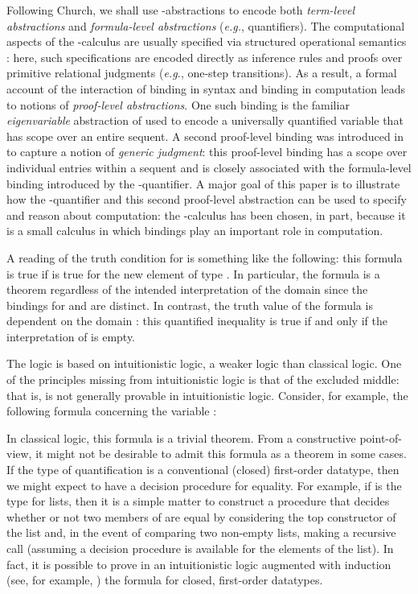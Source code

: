 \documentclass{acmtrans2m}
\begin{document}
Following Church, we shall use -abstractions to encode
both {\em term-level abstractions} and {\em formula-level
abstractions} ({\em e.g.}, quantifiers).  The computational aspects of the
-calculus are usually specified via structured operational
semantics \cite{plotkin81}: here, such specifications are encoded
directly as inference rules and proofs over primitive relational
judgments ({\em e.g.}, one-step transitions).  As a result, a formal account
of the interaction of binding in syntax and binding in computation
leads to notions of {\em proof-level abstractions}.  One such binding
is the familiar {\em eigenvariable} abstraction of
\cite{gentzen35} used to encode a universally quantified variable that has
scope over an entire sequent.  A second proof-level binding was
introduced in \cite{miller05tocl} to capture a notion of {\em generic
judgment}: this proof-level binding has a scope over individual
entries within a sequent and is closely associated with the
formula-level binding introduced by the -quantifier.  A major
goal of this paper is to illustrate how the -quantifier
and this second proof-level abstraction can be used to specify and
reason about computation: the -calculus has been chosen, in part,
because it is a small calculus in which bindings play an important role
in computation.

A reading of the truth condition for  is something
like the following: this formula is true if  is true for the new
element  of type .  In particular, the formula  is a theorem regardless of the
intended interpretation of the domain  since the bindings for
 and  are distinct.  In contrast, the truth value of the
formula  is dependent on the
domain : this quantified inequality is true if and only if 
the interpretation of  is empty.


The  logic is based on
intuitionistic logic, a weaker logic than classical logic.  One of the
principles missing from intuitionistic logic is that of the excluded
middle: that is,  is not generally provable in
intuitionistic logic.  Consider, for example, the following formula
concerning the variable :

In classical logic, this formula is a trivial theorem.  From a
constructive point-of-view, it might not be desirable to admit this
formula as a theorem in some cases. 
If the type of quantification  is
a conventional (closed) first-order datatype, then we might expect to have a
decision procedure for equality.  For example, if  is the type
for lists, then it is a simple matter to construct a procedure that
decides whether or not two members of  are equal by
considering the top constructor of the list and, in the event of
comparing two non-empty lists, making a recursive call (assuming a
decision procedure is available for the elements of the list).  In fact, it
is possible to prove in an intuitionistic logic augmented with
induction (see, for example, \cite{tiu04phd}) the formula  for
closed, first-order datatypes.  
\end{document}
